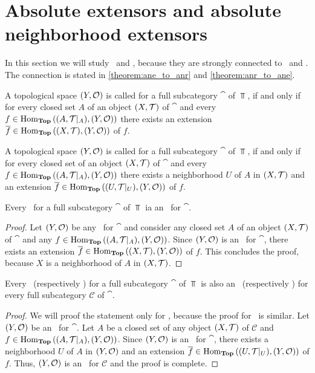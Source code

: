 \section{Absolute extensors and absolute neighborhood extensors}

In this section we will study \aexs\ and \anes, because they are strongly connected to \ars\ and \anrs. The connection is stated in \ref{theorem:ane_to_anr} and \ref{theorem:anr_to_ane}. 

\begin{definition}
	A topological space $\tspace[Y][O]$ is called \textit{\aex} for a full subcategory $\cat$ of $\Top$, if and only if for every closed set $A$ of an object $\tspace$ of $\cat$ and every $f \in \Hom_\Top\pbraces{\reltspace, \tspace[Y][O]}$ there exists an extension $\overline{f} \in \Hom_\Top\pbraces{\tspace, \tspace[Y][O]}$ of $f$.  
\end{definition}

\begin{definition}
	A topological space $\tspace[Y][O]$ is called \textit{\ane} for a full subcategory $\cat$ of $\Top$, if and only if for every closed set of an object $\tspace$ of $\cat$ and every $f \in \Hom_\Top\pbraces{\reltspace, \tspace[Y][O]}$ there exists a neighborhood $U$ of $A$ in $\tspace$ and an extension $\overline{f} \in \Hom_\Top\pbraces{\reltspace[U], \tspace[Y][O]}$ of $f$.
\end{definition}

\begin{proposition}
	Every \aex\ for a full subcategory $\cat$ of $\Top$ ia an \ane\ for $\cat$. 
\end{proposition}
\begin{proof}
	Let $\tspace[Y][O]$ be any \aex\ for $\cat$ and consider any closed set $A$ of an object $\tspace$ of $\cat$ and any $f \in \Hom_\Top\pbraces{\reltspace, \tspace[Y][O]}$. Since $\tspace[Y][O]$ is an \aex\ for $\cat$, there exists an extension $\overline{f} \in \Hom_\Top\pbraces{\tspace, \tspace[Y][O]}$ of $f$. This concludes the proof, because $X$ is a neighborhood of $A$ in $\tspace$. 
\end{proof}

\begin{proposition}
	Every \aex\ (respectively \ane) for a full subcategory $\cat$ of $\Top$ is also an \aex\ (respectively \ane) for every full subcategory $\mathcal{C}$ of $\cat$. 
\end{proposition}
\begin{proof}
	We will proof the statement only for \anes, because the proof for \aexs\ is similar. Let $\tspace[Y][O]$ be an \ane\ for $\cat$. Let $A$ be a closed set of any object $\tspace$ of $\mathcal{C}$ and $f \in \Hom_\Top\pbraces{\reltspace, \tspace[Y][O]}$. Since $\tspace[Y][O]$ is an \ane\ for $\cat$, there exists a neighborhood $U$ of $A$ in $\tspace[Y][O]$ and an extension $\overline{f} \in \Hom_\Top\pbraces{\reltspace[U], \tspace[Y][O]}$ of $f$. Thus, $\tspace[Y][O]$ is an \ane\ for $\mathcal{C}$ and the proof is complete.
\end{proof}

